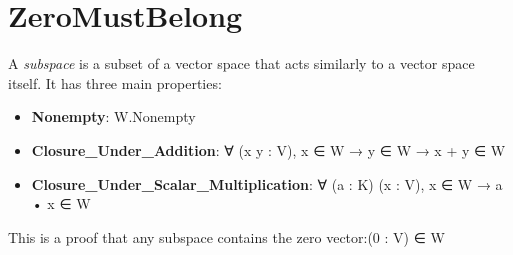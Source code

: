 \section{ZeroMustBelong}


\begin{definition}[Subspace]
  \leanok
  A \emph{subspace} is a subset of a vector space that acts similarly to a vector space itself. It has three main properties:
  \begin{itemize}
    \item \textbf{Nonempty}:
    W.Nonempty
    \item \textbf{Closure\_Under\_Addition}:
    ∀ (x y : V), x ∈ W → y ∈ W → x + y ∈ W
    \item \textbf{Closure\_Under\_Scalar\_Multiplication}:
    ∀ (a : K) (x : V), x ∈ W → a • x ∈ W
  \end{itemize}
\end{definition}

\begin{theorem}
  \label{theorem : subset_contains_zero}
  \leanok
  This is a proof that any subspace contains the zero vector:(0 : V) ∈ W
\end{theorem}
